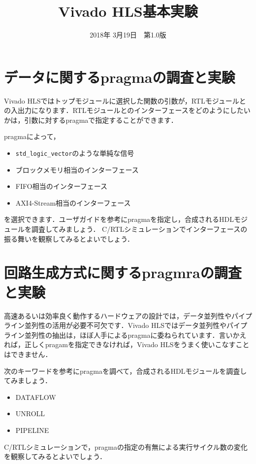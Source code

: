 \documentclass[a4paper,dvipdfmx]{jsarticle}
\begin{document}
\title{Vivado HLS基本実験}
\author{}
\date{2018年 3月19日~~第1.0版}
\maketitle

\section{データに関するpragmaの調査と実験}
Vivado HLSではトップモジュールに選択した関数の引数が，RTLモジュールとの入出力になります．RTLモジュールとのインターフェースをどのようにしたいかは，引数に対するpragmaで指定することができます．

pragmaによって，
\begin{itemize}
 \item \verb|std_logic_vector|のような単純な信号
 \item ブロックメモリ相当のインターフェース
 \item FIFO相当のインターフェース
 \item AXI4-Stream相当のインターフェース
\end{itemize}
を選択できます．ユーザガイドを参考にpragmaを指定し，合成されるHDLモジュールを調査してみましょう．
C/RTLシミュレーションでインターフェースの振る舞いを観察してみるとよいでしょう．

\section{回路生成方式に関するpragmraの調査と実験}
高速あるいは効率良く動作するハードウェアの設計では，データ並列性やパイプライン並列性の活用が必要不可欠です．Vivado HLSではデータ並列性やパイプライン並列性の抽出は，ほぼ人手によるpragmaに委ねられています．言いかえれば，正しくpragamを指定できなければ，Vivado HLSをうまく使いこなすことはできません．

次のキーワードを参考にpragmaを調べて，合成されるHDLモジュールを調査してみましょう．
\begin{itemize}
 \item DATAFLOW
 \item UNROLL
 \item PIPELINE
\end{itemize}
C/RTLシミュレーションで，pragmaの指定の有無による実行サイクル数の変化を観察してみるとよいでしょう．
\end{document}
